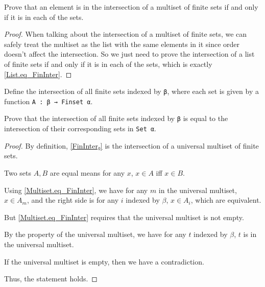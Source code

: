 \begin{lemma}\label{Multiset.eq_FinInter}
  \leanok
  Prove that an element is in the intersection of a multiset of finite sets if and only if it is in each of the sets.
\end{lemma}

\begin{proof}
  \leanok
  When talking about the intersection of a multiset of finite sets, we can safely treat the multiset as the list with the same elements in it since order doesn't affect the intersection. So we just need to prove the intersection of a list of finite sets if and only if it is in each of the sets, which is exactly \ref{List.eq_FinInter}.
\end{proof}

\begin{definition}\label{FinInter₀}
  \leanok
  Define the intersection of all finite sets indexed by \verb|β|, where each set is given by a function \verb|A : β → Finset α|.
\end{definition}

\begin{lemma}\label{eq_FinInter₀}
  \leanok
  Prove that the intersection of all finite sets indexed by \verb|β| is equal to the intersection of their corresponding sets in \verb|Set α|.
\end{lemma}

\begin{proof}
  \leanok
  By definition, \ref{FinInter₀} is the intersection of a universal multiset of finite sets.

  Two sets $A,B$ are equal means for any $x$, $x\in A$ iff $x\in B$.

  Using \ref{Multiset.eq_FinInter}, we have for any $m$ in the universal multiset, $x∈A_m$, and the right side is for any $i$ indexed by $β$, $x∈A_i$, which are equivalent.

  But \ref{Multiset.eq_FinInter} requires that the universal multiset is not empty.

  By the property of the universal multiset, we have for any $t$ indexed by $β$, $t$ is in the universal multiset.

  If the universal multiset is empty, then we have a contradiction.

  Thus, the statement holds.
\end{proof}

